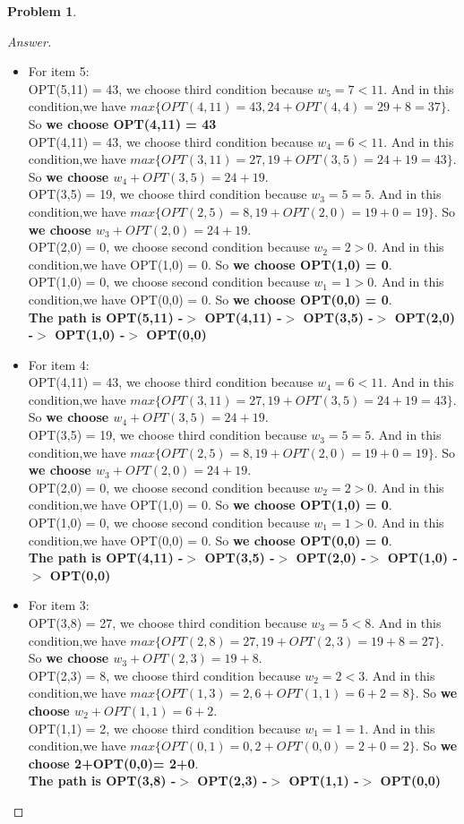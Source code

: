 \documentclass[11pt]{article}
\theoremstyle{definition}
\theoremstyle{definition}
\newtheorem{required}{Problem}
\theoremstyle{definition}
\begin{document}
\begin{required}
\begin{proof}[Answer]
\begin{itemize}
\item For item 5:\\
OPT(5,11) = 43, we choose third condition because $w_5 = 7 < 11$. And in this condition,we have $max\{OPT(4,11) = 43 ,24+OPT(4,4)= 29+8=37\}$. So \textbf{we choose OPT(4,11) = 43}\\
OPT(4,11) = 43, we choose third condition because $w_4 = 6 < 11$. And in this condition,we have $max\{OPT(3,11) = 27 ,19+OPT(3,5)= 24+19=43\}$. So \textbf{we choose $w_4 + OPT(3,5) = 24+19$}.\\
OPT(3,5) = 19, we choose third condition because $w_3 = 5 = 5$. And in this condition,we have $max\{OPT(2,5) = 8 ,19+OPT(2,0)= 19+0=19\}$. So \textbf{we choose $w_3 + OPT(2,0) = 24+19$}.\\
OPT(2,0) = 0, we choose second condition because $w_2 = 2 > 0$. And in this condition,we have OPT(1,0) = 0. So \textbf{we choose  OPT(1,0) = 0}.\\
OPT(1,0) = 0, we choose second condition because $w_1 = 1 > 0$. And in this condition,we have OPT(0,0) = 0. So \textbf{we choose  OPT(0,0) = 0}.\\
\textbf{The path is  OPT(5,11) -$>$ OPT(4,11) -$>$ OPT(3,5) -$>$ OPT(2,0) -$>$ OPT(1,0) -$>$ OPT(0,0)}

\item For item 4:\\
OPT(4,11) = 43, we choose third condition because $w_4 = 6 < 11$. And in this condition,we have $max\{OPT(3,11) = 27 ,19+OPT(3,5)= 24+19=43\}$. So \textbf{we choose $w_4 + OPT(3,5) = 24+19$}.\\
OPT(3,5) = 19, we choose third condition because $w_3 = 5 = 5$. And in this condition,we have $max\{OPT(2,5) = 8 ,19+OPT(2,0)= 19+0=19\}$. So \textbf{we choose $w_3 + OPT(2,0) = 24+19$}.\\
OPT(2,0) = 0, we choose second condition because $w_2 = 2 > 0$. And in this condition,we have OPT(1,0) = 0. So \textbf{we choose  OPT(1,0) = 0}.\\
OPT(1,0) = 0, we choose second condition because $w_1 = 1 > 0$. And in this condition,we have OPT(0,0) = 0. So \textbf{we choose  OPT(0,0) = 0}.\\
\textbf{The path is  OPT(4,11) -$>$ OPT(3,5) -$>$ OPT(2,0) -$>$ OPT(1,0) -$>$ OPT(0,0)}

\item For item 3:\\
OPT(3,8) = 27, we choose third condition because $w_3 = 5 < 8$. And in this condition,we have $max\{OPT(2,8) = 27 ,19+OPT(2,3)= 19+8=27\}$. So \textbf{we choose $w_3 + OPT(2,3) = 19+8$}.\\
OPT(2,3) = 8, we choose third condition because $w_2= 2 < 3$. And in this condition,we have $max\{OPT(1,3) = 2 ,6+OPT(1,1)= 6+2=8\}$. So \textbf{we choose $w_2 + OPT(1,1) = 6+2$}.\\
OPT(1,1) = 2, we choose third condition because $w_1= 1 = 1$. And in this condition,we have $max\{OPT(0,1) = 0 ,2+OPT(0,0)= 2+0=2\}$. So \textbf{we choose  2+OPT(0,0)= 2+0}.\\
\textbf{The path is  OPT(3,8) -$>$ OPT(2,3) -$>$ OPT(1,1) -$>$ OPT(0,0) }


\end{itemize}
\end{proof}
\end{required}
\end{document}
